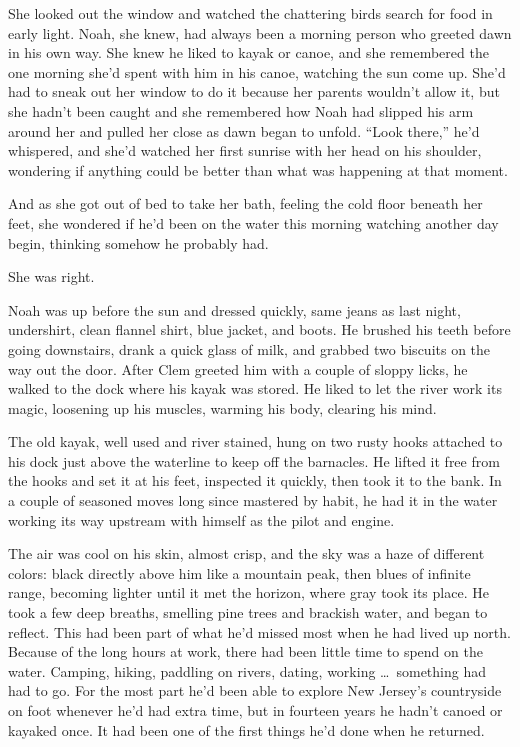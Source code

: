 \documentclass[10pt, twoside, openright]{book}
\begin{document}
She looked out the window and watched the chattering birds search for
food in early light. Noah, she knew, had always been a morning person
who greeted dawn in his own way. She knew he liked to kayak or canoe,
and she remembered the one morning she'd spent with him in his canoe,
watching the sun come up. She'd had to sneak out her window to do it
because her parents wouldn't allow it, but she hadn't been caught and
she remembered how Noah had slipped his arm around her and pulled her
close as dawn began to unfold. ``Look there,'' he'd whispered, and she'd
watched her first sunrise with her head on his shoulder, wondering if
anything could be better than what was happening at that moment.

And as she got out of bed to take her bath, feeling the cold floor
beneath her feet, she wondered if he'd been on the water this morning
watching another day begin, thinking somehow he probably had.


She was right.


Noah was up before the sun and dressed quickly, same jeans as last
night, undershirt, clean flannel shirt, blue jacket, and boots. He
brushed his teeth before going downstairs, drank a quick glass of milk,
and grabbed two biscuits on the way out the door. After Clem greeted him
with a couple of sloppy licks, he walked to the dock where his kayak was
stored. He liked to let the river work its magic, loosening up his
muscles, warming his body, clearing his mind.

The old kayak, well used and river stained, hung on two rusty hooks
attached to his dock just above the waterline to keep off the barnacles.
He lifted it free from the hooks and set it at his feet, inspected it
quickly, then took it to the bank. In a couple of seasoned moves long
since mastered by habit, he had it in the water working its way upstream
with himself as the pilot and engine.

The air was cool on his skin, almost crisp, and the sky was a haze of
different colors: black directly above him like a mountain peak, then
blues of infinite range, becoming lighter until it met the horizon,
where gray took its place. He took a few deep breaths, smelling pine
trees and brackish water, and began to reflect. This had been part of
what he'd missed most when he had lived up north. Because of the long
hours at work, there had been little time to spend on the water.
Camping, hiking, paddling on rivers, dating, working   \dots\ something had
had to go. For the most part he'd been able to explore New Jersey's
countryside on foot whenever he'd had extra time, but in fourteen years
he hadn't canoed or kayaked once. It had been one of the first things
he'd done when he returned.
\end{document}
